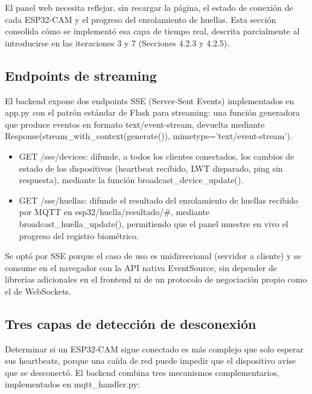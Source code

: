 El panel web necesita reflejar, sin recargar la página, el estado de conexión de cada ESP32-CAM y el progreso del enrolamiento de huellas. Esta sección consolida cómo se implementó esa capa de tiempo real, descrita parcialmente al introducirse en las iteraciones 3 y 7 (Secciones 4.2.3 y 4.2.5).

\subsection{Endpoints de streaming}

El backend expone dos endpoints SSE (Server-Sent Events) implementados en app.py con el patrón estándar de Flask para streaming: una función generadora que produce eventos en formato text/event-stream, devuelta mediante Response(stream\_with\_context(generate()), mimetype='text/event-stream').

\begin{itemize}
    \item GET /sse/devices: difunde, a todos los clientes conectados, los cambios de estado de los dispositivos (heartbeat recibido, LWT disparado, ping sin respuesta), mediante la función broadcast\_device\_update().
    \item GET /sse/huellas: difunde el resultado del enrolamiento de huellas recibido por MQTT en esp32/huella/resultado/\#, mediante broadcast\_huella\_update(), permitiendo que el panel muestre en vivo el progreso del registro biométrico.
\end{itemize}

Se optó por SSE porque el caso de uso es unidireccional (servidor a cliente) y se consume en el navegador con la API nativa EventSource, sin depender de librerías adicionales en el frontend ni de un protocolo de negociación propio como el de WebSockets.

\subsection{Tres capas de detección de desconexión}

Determinar si un ESP32-CAM sigue conectado es más complejo que solo esperar sus heartbeats, porque una caída de red puede impedir que el dispositivo avise que se desconectó. El backend combina tres mecanismos complementarios, implementados en mqtt\_handler.py:

